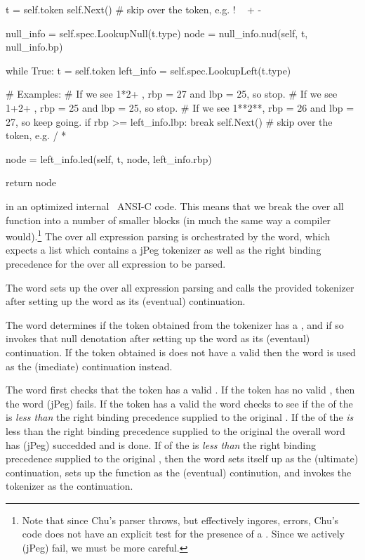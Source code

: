     t = self.token
    self.Next()  # skip over the token, e.g. ! ~ + -

    null_info = self.spec.LookupNull(t.type)
    node = null_info.nud(self, t, null_info.bp)

    while True:
      t = self.token
      left_info = self.spec.LookupLeft(t.type)

      # Examples:
      # If we see 1*2+  , rbp = 27 and lbp = 25, so stop.
      # If we see 1+2+  , rbp = 25 and lbp = 25, so stop.
      # If we see 1**2**, rbp = 26 and lbp = 27, so keep going.
      if rbp >= left_info.lbp:
        break
      self.Next()  # skip over the token, e.g. / *

      node = left_info.led(self, t, node, left_info.rbp)

    return node
\stoptyping

\noindent in an optimized internal \joylol\ ANSI-C code. This means that 
we break the over all function into a number of smaller blocks (in much 
the same way a compiler would).\footnote{Note that since Chu's parser 
throws, but effectively ingores, errors, Chu's code does not have an 
explicit test for the presence of a . Since we 
actively (jPeg) fail, we must be more careful.} The over all expression 
parsing is orchestrated by the  word, which expects 
a list which contains a jPeg tokenizer as well as the right binding 
precedence for the over all expression to be parsed. 

The  word sets up the over all expression parsing 
and calls the provided tokenizer after setting up the 
 word as its (eventual) continuation. 

The  word determines if the token obtained from 
the tokenizer has a , and if so invokes that null 
denotation after setting up the  word as its 
(eventaul) continuation. If the token obtained is does not have a valid 
 then the  word is used 
as the (imediate) continuation instead. 

The  word first checks that the token has a 
valid . If the token has no valid , then the  word (jPeg) fails. If the 
token has a valid  the  
word checks to see if the  of the 
 is \emph{less than} the right binding precedence 
supplied to the original . If the  of the  \emph{is} less than the 
right binding precedence supplied to the original  
the overall  word has (jPeg) succedded and is done. 
If  of the  is 
\emph{less than} the right binding precedence supplied to the original 
, then the  word sets 
itself up as the (ultimate) continuation, sets up the  function as the (eventual) continution, and invokes the 
tokenizer as the continuation. 

